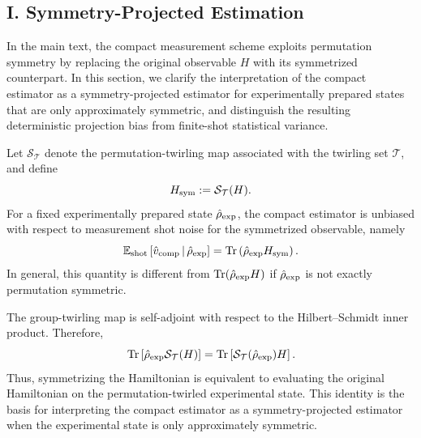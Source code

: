 \documentclass[prl,aps,notitlepage,superscriptaddress,showpacs,nofootinbib]{revtex4-2}
\newcommand{\red}[1]{{\color{red} #1}}
\begin{document}
\subsection{\red{I. Symmetry-Projected Estimation}}
\label{subsec:symmetry_projected_estimation}
\red{In the main text, the compact measurement scheme exploits permutation symmetry
by replacing the original observable $H$ with its symmetrized counterpart. 
In this section, we clarify the interpretation of the compact estimator as a
symmetry-projected estimator for experimentally prepared states that are only
approximately symmetric, and distinguish the resulting deterministic projection
bias from finite-shot statistical variance.

Let $\mathcal{S}_{\mathcal T}$ denote the permutation-twirling map associated
with the twirling set $\mathcal T$, and define
\begin{equation}
    H_{\rm sym}
    :=
    \mathcal{S}_{\mathcal T}(H).
\end{equation}
For a fixed experimentally prepared state $\hat{\rho}_{\rm exp}$, the compact
estimator is unbiased with respect to measurement shot noise for the
symmetrized observable, namely
\begin{equation}
    \mathbb{E}_{\rm shot}
    \left[
        \hat{v}_{\rm comp}
        \,\middle|\,
        \hat{\rho}_{\rm exp}
    \right]
    =
    \operatorname{Tr}
    \left(
        \hat{\rho}_{\rm exp}H_{\rm sym}
    \right).
    \label{eq:compact_shot_unbiased}
\end{equation}
In general, this quantity is different from
$\operatorname{Tr}(\hat{\rho}_{\rm exp}H)$ if
$\hat{\rho}_{\rm exp}$ is not exactly permutation symmetric.

The group-twirling map is self-adjoint with respect to the Hilbert--Schmidt
inner product. Therefore,
\begin{equation}
    \operatorname{Tr}
    \left[
        \hat{\rho}_{\rm exp}\mathcal{S}_{\mathcal T}(H)
    \right]
    =
    \operatorname{Tr}
    \left[
        \mathcal{S}_{\mathcal T}(\hat{\rho}_{\rm exp})H
    \right].
    \label{eq:twirl_self_adjoint}
\end{equation}
Thus, symmetrizing the Hamiltonian is equivalent to evaluating the original
Hamiltonian on the permutation-twirled experimental state. This identity is the
basis for interpreting the compact estimator as a symmetry-projected estimator
when the experimental state is only approximately symmetric.

}
\end{document}
